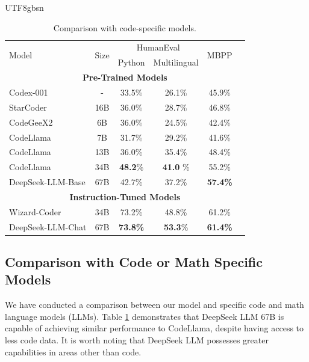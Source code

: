 \documentclass[11pt, a4paper, logo, copyright, nonumbering]{deepseek}
\begin{document}
\begin{CJK*}{UTF8}{gbsn}
\begin{table}[h]
            
		\begin{tabular}{lccccc}
			\toprule
                 \multirow{2}{*}{Model} & \multirow{2}{*}{Size} & \multicolumn{2}{c}{HumanEval} & \multirow{2}{*}{MBPP} \\
                 
                  & & Python & Multilingual & & \\
            \midrule
            \multicolumn{6}{c}{\bf{Pre-Trained Models}} \\
            \midrule
            Codex-001 & - & 33.5\% & 26.1\% & 45.9\%  \\
            StarCoder & 16B & 36.0\% & 28.7\% & 46.8\% \\
            CodeGeeX2 & 6B & 36.0\% & 24.5\% & 42.4\%  \\
            CodeLlama & 7B & 31.7\% & 29.2\% & 41.6\% \\
            CodeLlama & 13B & 36.0\% & 35.4\% & 48.4\%  \\
            CodeLlama & 34B & \textbf{48.2}\% & \textbf{41.0} \% & 55.2\% \\
           
            DeepSeek-LLM-Base & 67B & 42.7\% & 37.2\% & \textbf{57.4\%}  \\
            \midrule
            \multicolumn{6}{c}{\bf{Instruction-Tuned Models}} \\
            \midrule
            Wizard-Coder & 34B & 73.2\% & 48.8\% & 61.2\% \\
            DeepSeek-LLM-Chat & 67B & \textbf{73.8\%} & \textbf{53.3}\% & \textbf{61.4\%} &\\
		\bottomrule
		\end{tabular}
    
        	\caption{\centering Comparison with code-specific models. \label{table:compare-code}}
\end{table}

\subsection{Comparison with Code or Math Specific Models}
\label{sec:code-and-math}

We have conducted a comparison between our model and specific code and math language models (LLMs). Table \ref{table:compare-code} demonstrates that DeepSeek LLM 67B is capable of achieving similar performance to CodeLlama, despite having access to less code data. It is worth noting that DeepSeek LLM possesses greater capabilities in areas other than code. 


\end{CJK*}
\end{document}
